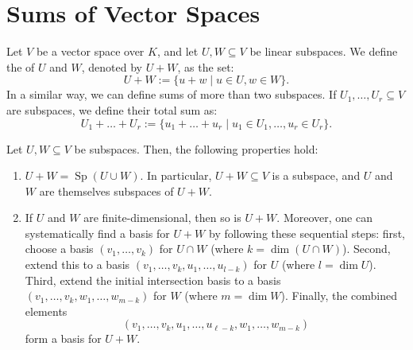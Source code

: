 \renewcommand{\thetheorem}{\thechapter.\arabic{theorem}}
\setcounter{chapter}{13} %
\setcounter{theorem}{0}

\chapter{Sums of Vector Spaces}

\begin{definition}
\label{def:sum_of_subspaces}
Let $V$ be a vector space over $K$, and let $U, W \subseteq V$ be linear subspaces. We define the  of $U$ and $W$, denoted by $U + W$, as the set:
\[
U + W := \{u + w \mid u \in U, w \in W\}.
\]
In a similar way, we can define sums of more than two subspaces. If $U_1, \dots, U_r \subseteq V$ are subspaces, we define their total sum as:
\[
U_1 + \dots + U_r := \{u_1 + \dots + u_r \mid u_1 \in U_1, \dots, u_r \in U_r\}.
\]
\end{definition}

\begin{proposition}
\label{prop:properties_of_sums}
Let $U, W \subseteq V$ be subspaces. Then, the following properties hold:
\begin{enumerate}
    \item $U + W = \operatorname{Sp}(U \cup W)$. In particular, $U + W \subseteq V$ is a subspace, and $U$ and $W$ are themselves subspaces of $U + W$.
    \item If $U$ and $W$ are finite-dimensional, then so is $U + W$. Moreover, one can systematically find a basis for $U + W$ by following these sequential steps: first, choose a basis $(v_1, \dots, v_k)$ for $U \cap W$ (where $k = \dim(U \cap W)$). Second, extend this to a basis $(v_1, \dots, v_k, u_1, \dots, u_{l-k})$ for $U$ (where $l = \dim U$). Third, extend the initial intersection basis to a basis $(v_1, \dots, v_k, w_1, \dots, w_{m-k})$ for $W$ (where $m = \dim W$). Finally, the combined elements 
    \[(v_1, \dots, v_k, u_1, \dots, u_{\ell-k}, w_1, \dots, w_{m-k})\] 
    form a basis for $U + W$.
\end{enumerate}
\end{proposition}

